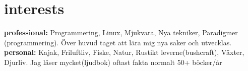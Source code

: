 \documentclass[]{cv-style}          %
\begin{document}
\section{interests}
  \vspace{-0.2cm}

  \textbf{professional:} Programmering, Linux, Mjukvara, Nya tekniker, 
  Paradigmer (programmering).
  Över huvud taget att lära mig nya saker och utvecklas.\\
\textbf{personal:} Kajak, Friluftliv, Fiske, Natur, Rustikt leverne(bushcraft), 
Växter, Djurliv. Jag läser mycket(ljudbok) oftast fakta normalt 50+ böcker/år

\end{document}
